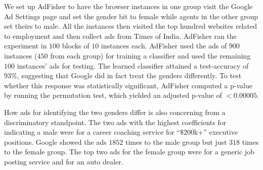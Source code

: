 \documentclass[10pt, onecolumn]{report}
\begin{document}
%
We set up AdFisher to have the browser instances in one group visit the Google Ad Settings 
page and set the gender bit to female while agents in the other group set theirs to male.
All the instances then visited the top hundred websites related to employment
and then collect ads from Times of India.
AdFisher ran the experiment in $100$ blocks of $10$ instances each. 
AdFisher used the ads of $900$ instances ($450$ from each group) for 
training a classifier %
and used the remaining $100$ instances' ads for testing.  
The learned classifier attained a test-accuracy of $93\%$, 
suggesting that Google did in fact treat the genders differently.
To test whether this response was statistically significant, 
AdFisher computed a p-value by running the permutation test, which
yielded an adjusted p-value of $< 0.00005$. %

How ads for identifying the two genders differ is also concerning from a discriminatory
standpoint. The two ads with the highest coefficients for indicating a 
male were for a career coaching service for ``$\$200$k+'' executive positions. 
Google showed the ads $1852$ times to the male group 
but just $318$ times to the female group.
The top two ads for the female group were for a generic job posting service 
and for an auto dealer.
\end{document}
